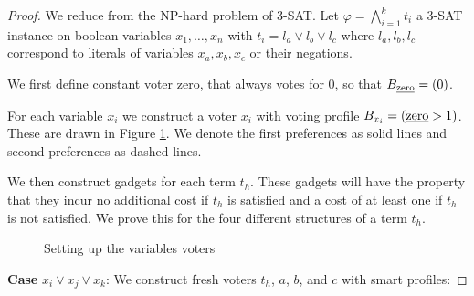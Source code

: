\documentclass[11pt,a4paper, titlepage]{article}
\theoremstyle{definition}
\begin{document}
\begin{proof}
    We reduce from the NP-hard problem of \textsc{3-SAT}.
    Let $\varphi = \bigwedge_{i = 1}^k t_i $ a \textsc{3-SAT} instance on boolean variables $x_1, \ldots, x_n$ with $t_i = l_a \lor l_b \lor l_c $ where $l_a, l_b, l_c$ correspond to literals of variables $x_a, x_b, x_c$ or their negations.
    
    We first define constant voter \underline{zero}, that always votes for 0, so that $B_{\text{\underline{zero}}} = (0)$.



For each variable $x_i$ we construct a voter $x_i$ with voting profile $B_{x_i} = (  \text{\underline{zero}} > 1) $. These are drawn in Figure \ref{fig:votes}. We denote the first preferences as solid lines and second preferences as dashed lines.


We then construct gadgets for each term $t_h$. 
These gadgets will have the property that they incur no additional cost if $t_h$ is satisfied and a cost of at least one if $t_h$ is not satisfied. We prove this for the four different structures of a term $t_h$.

\begin{figure}
    \centering
    \qquad
    \caption{Setting up the variables voters}
    \label{fig:votes}
\end{figure}

\textbf{Case} $x_i \lor x_j \lor x_k$: We construct fresh voters $t_h$, $a$, $b$, and $c$ with smart profiles:


\end{proof}
\end{document}
